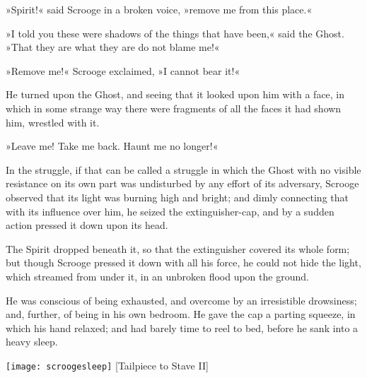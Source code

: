 »Spirit!« said Scrooge in a broken voice, »remove me from this place.«

»I told you these were shadows of the things that have been,« said the Ghost. »That they are what they are do not blame me!«

»Remove me!« Scrooge exclaimed, »I cannot bear it!«

He turned upon the Ghost, and seeing that it looked upon him with a face, in which in some strange way there were fragments of all the faces it had shown him, wrestled with it.

»Leave me! Take me back. Haunt me no longer!«

In the struggle, if that can be called a struggle in which the Ghost with no visible resistance on its own part was undisturbed by any effort of its adversary, Scrooge observed that its light was burning high and bright; and dimly connecting that with its influence over him, he seized the extinguisher-cap, and by a sudden action pressed it down upon its head.

The Spirit dropped beneath it, so that the extinguisher covered its whole form; but though Scrooge pressed it down with all his force, he could not hide the light, which streamed from under it, in an unbroken flood upon the ground.

He was conscious of being exhausted, and overcome by an irresistible drowsiness; and, further, of being in his own bedroom. He gave the cap a parting squeeze, in which his hand relaxed; and had barely time to reel to bed, before he sank into a heavy sleep.
\nopagebreak[4]
\begin{center}
\texttt{[image: scroogesleep]}
[Tailpiece to Stave II]{}
\end{center}